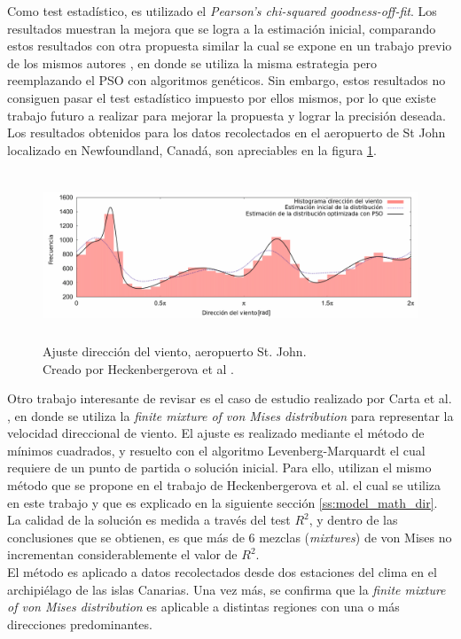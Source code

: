 Como test estadístico, es utilizado el \emph{Pearson's chi-squared goodness-off-fit}. Los resultados muestran la mejora que se logra a la estimación inicial, comparando estos resultados con otra propuesta similar la cual se expone en un trabajo previo de los mismos autores \cite{Heckenbergerova13}, en donde se utiliza la misma estrategia pero reemplazando el PSO con algoritmos genéticos. Sin embargo, estos resultados no consiguen pasar el test estadístico impuesto por ellos mismos, por lo que existe trabajo futuro  a realizar para mejorar la propuesta y lograr la precisión deseada.\\
Los resultados obtenidos para los datos recolectados en el aeropuerto de St John localizado en Newfoundland, Canadá, son apreciables en la figura \ref{fig:dir_pso}.
\begin{figure}[h!]
    \centering    
    \includegraphics[height=50mm]{figures/dir_pso.png} 
    \caption{Ajuste dirección del viento, aeropuerto St. John.\\Creado por Heckenbergerova et al \cite{Heckenbergerova15}.}
    \vspace{-.25cm} 
    \label{fig:dir_pso}
\end{figure}

Otro trabajo interesante de revisar es el caso de estudio realizado por Carta et al. \cite{Carta07}, en donde se utiliza la \emph{finite mixture of von Mises distribution} para representar la velocidad direccional de viento. El ajuste es realizado mediante el método de mínimos cuadrados, y resuelto con el algoritmo Levenberg-Marquardt \cite{Gavin16} el cual requiere de un punto de partida o solución inicial. Para ello, utilizan el mismo método que se propone en el trabajo de Heckenbergerova et al. \cite{Heckenbergerova13} el cual se utiliza en este trabajo y que es explicado en la siguiente sección \ref{ss:model_math_dir}. La calidad de la solución es medida a través del test $R^2$, y dentro de las conclusiones que se obtienen, es que más de 6 mezclas (\emph{mixtures}) de von Mises no incrementan considerablemente el valor de $R^2$.\\
El método es aplicado a datos recolectados desde dos estaciones del clima en el archipiélago de las islas Canarias. Una vez más, se confirma que la \emph{finite mixture of von Mises distribution} es aplicable a distintas regiones con una o más direcciones predominantes. 

